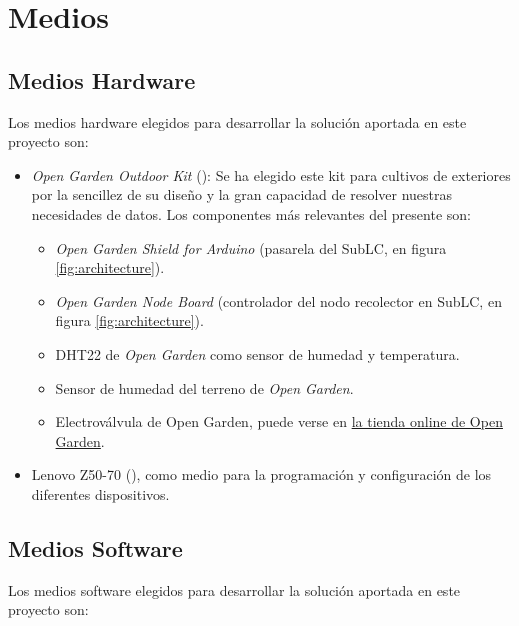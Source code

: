 
\newpage
\section{Medios}
\label{sec:means}

\subsection{Medios Hardware}
\label{subsec:hardware}

Los medios hardware elegidos para desarrollar la solución aportada en este proyecto son:

\begin{itemize}
    \item \textit{Open Garden Outdoor Kit} (\cite{open.garden.01}): Se ha elegido este kit para cultivos de exteriores por la sencillez de su diseño y la gran capacidad de resolver nuestras necesidades de datos. Los componentes más relevantes del presente son:
    \begin{itemize}
        \item \textit{Open Garden Shield for Arduino} (pasarela del SubLC, en figura \ref{fig:architecture}).
        \item \textit{Open Garden Node Board} (controlador del nodo recolector en SubLC, en figura \ref{fig:architecture}).
        \item DHT22 de \textit{Open Garden} como sensor de humedad y temperatura.
        \item Sensor de humedad del terreno de \textit{Open Garden}.
        \item Electroválvula de Open Garden, puede verse en \href{https://www.cooking-hacks.com/electro-valve-for-open-garden}{la tienda online de Open Garden}.
    \end{itemize}
    \item Lenovo Z50-70 (\cite{lenovo.01}),  como medio para la programación y configuración de los diferentes dispositivos.
\end{itemize}

\subsection{Medios Software}
\label{subsec:Software}

Los medios software elegidos para desarrollar la solución aportada en este proyecto son:

